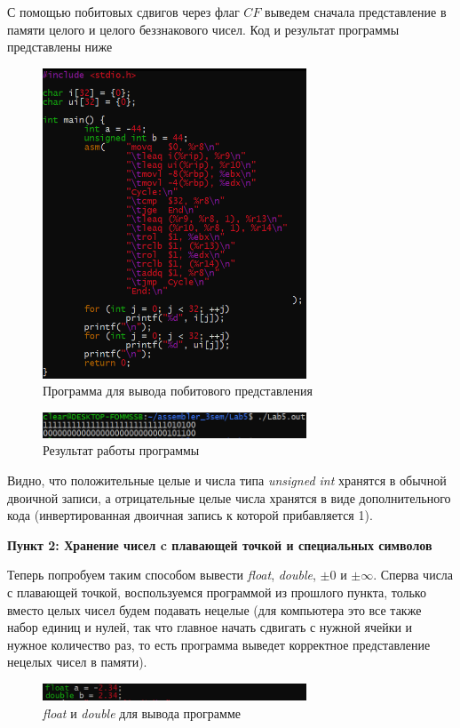 \documentclass[a4paper,12pt]{article}
\begin{document}
С помощью побитовых сдвигов через флаг $CF$ выведем сначала представление в памяти целого и целого беззнакового чисел. Код и результат программы представлены ниже
\begin{figure}[H]\label{fig: bits i and ui}
    \centering
    \includegraphics[width=0.7\textwidth]{Вставка побитового представления.png}
    \caption{Программа для вывода побитового представления}
\end{figure}
\begin{figure}[H]\label{fig: bits i and ui result}
    \centering
    \includegraphics[width=0.7\textwidth]{Побитовое представление i ui.png}
    \caption{Результат работы программы}
\end{figure}
Видно, что положительные целые и числа типа \textit{unsigned int} хранятся в обычной двоичной записи, а отрицательные целые числа хранятся в виде дополнительного кода (инвертированная двоичная запись к которой прибавляется 1). 
\newpage

\textbf{Пункт 2: Хранение чисел c плавающей точкой и специальных символов}

Теперь попробуем таким способом вывести \textit{float}, \textit{double}, $\pm 0$ и $\pm\infty$. Сперва числа с плавающей точкой, воспользуемся программой из прошлого пункта, только вместо целых чисел будем подавать нецелые (для компьютера это все также набор единиц и нулей, так что главное начать сдвигать с нужной ячейки и нужное количество раз, то есть программа выведет корректное представление нецелых чисел в памяти).
\begin{figure}[H]\label{fig: bits d and f}
    \centering
    \includegraphics[width=0.7\textwidth]{Вставка f и d.png}
    \caption{\textit{float} и \textit{double} для вывода программе}
\end{figure}
\end{document}
